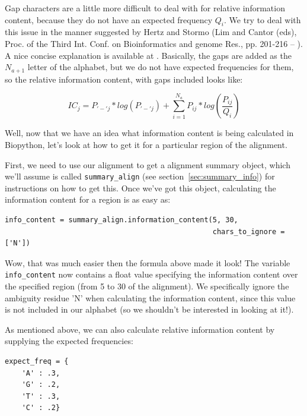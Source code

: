 \documentclass{report}
\begin{document}
Gap characters are a little more difficult to deal with for relative information content, because they do not have an expected frequency $Q_{i}$. We try to deal with this issue in the manner suggested by Hertz and Stormo (Lim and Cantor (eds), Proc. of the Third Int. Conf. on Bioinformatics and genome Res., pp. 201-216 -- ). A nice concise explanation is available at . Basically, the gaps are added as the $N_{a + 1}$ letter of the alphabet, but we do not have expected frequencies for them, so the relative information content, with gaps included looks like:

\begin{displaymath}
IC_{j} = P_{'-'j} * log(P_{'-'j}) + \sum_{i=1}^{N_{a}} P_{ij} * log(\frac{P_{ij}}{Q_{i}}) 
\end{displaymath}

Well, now that we have an idea what information content is being calculated in Biopython, let's look at how to get it for a particular region of the alignment.


First, we need to use our alignment to get a alignment summary object, which we'll assume is called \verb|summary_align| (see section~\ref{sec:summary_info}) for instructions on how to get this. Once we've got this object, calculating the information content for a region is as easy as:

\begin{verbatim}
info_content = summary_align.information_content(5, 30, 
                                                 chars_to_ignore = ['N'])
\end{verbatim}

Wow, that was much easier then the formula above made it look! The variable \verb|info_content| now contains a float value specifying the information content over the specified region (from 5 to 30 of the alignment). We specifically ignore the ambiguity residue 'N' when calculating the information content, since this value is not included in our alphabet (so we shouldn't be interested in looking at it!).


As mentioned above, we can also calculate relative information content by supplying the expected frequencies:

\begin{verbatim}
expect_freq = {
    'A' : .3,
    'G' : .2,
    'T' : .3,
    'C' : .2}
\end{verbatim}
\end{document}

